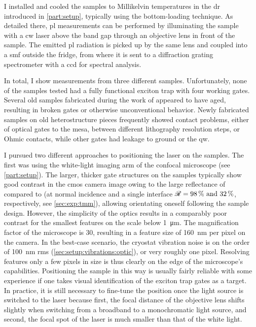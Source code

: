 I installed and cooled the samples to Millikelvin temperatures in the \gls{dr} introduced in \cref{part:setup}, typically using the bottom-loading technique.
As detailed there, \gls{pl} measurements can be performed by illuminating the sample with a \gls{cw} laser above the band gap through an objective lens in front of the sample.
The emitted \gls{pl} radiation is picked up by the same lens and coupled into a \gls{smf} outside the fridge, from where it is sent to a diffraction grating spectrometer with a \gls{ccd} for spectral analysis.

In total, I show measurements from three different samples.
Unfortunately, none of the samples tested had a fully functional exciton trap with four working gates.
Several old samples fabricated during the work of \citet{Descamps2021} appeared to have aged, resulting in broken gates or otherwise unconventional behavior.
Newly fabricated samples on old heterostructure pieces frequently showed contact problems, either of optical gates to the mesa, between different lithography resolution steps, or Ohmic contacts, while other gates had leakage to ground or the \gls{qw}.

I pursued two different approaches to positioning the laser on the samples.
The first was using the white-light imaging arm of the confocal microscope (see \cref{part:setup}).
The larger, thicker gate structures on the samples typically show good contrast in the \acrshort{cmos} camera image owing to the large reflectance of  compared to  (at normal incidence and a single interface $\reflectance = \qtylist{98;32}{\percent}$, respectively, see \cref{sec:exp:tmm}), allowing orientating oneself following the sample design.
However, the simplicity of the optics
results in a comparably poor contrast for the smallest features on the scale below \qty{1}{\micro\meter}.
The magnification factor of the microscope is \num{30}, resulting in a feature size of \qty{160}{\nano\meter} per pixel on the camera.
In the best-case scenario, the cryostat vibration noise is on the order of \qty{100}{\nano\meter} \gls{rms} (\cref{sec:setup:vibrations:optic}), or very roughly one pixel.
Resolving features only a few pixels in size is thus clearly on the edge of the microscope's capabilities.
Positioning the sample in this way is usually fairly reliable with some experience if one takes visual identification of the exciton trap gates as a target.
In practice, it is still necessary to fine-tune the position once the light source is switched to the laser because first, the focal distance of the objective lens shifts slightly when switching from a broadband to a monochromatic light source, and second, the focal spot of the laser is much smaller than that of the white light.

